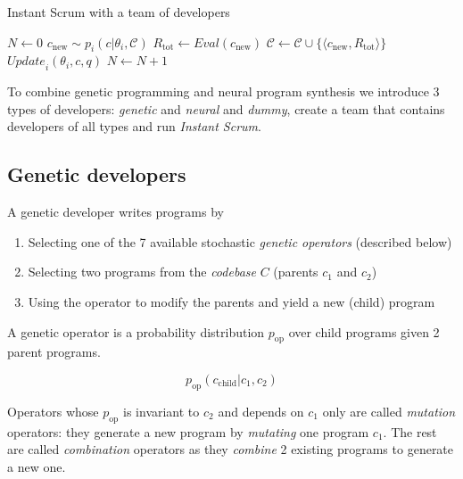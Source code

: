 \begin{algorithm}[H]
\begin{algorithmic}[1]
\caption{Instant Scrum with a team of developers}
\label{alg:instantscrum}
\State $N \gets 0$
\State $c_\text{new}\sim p_i(c | \theta_i, \mathcal{C})$ 
\State $R_\text{tot} \gets \mathit{Eval}(c_\text{new})$
\State $\mathcal{C} \gets \mathcal{C} \cup \{\langle c_\text{new}, R_\text{tot} \rangle\}$
\State $\mathit{Update}_i(\theta_i, c, q)$
\State $N \gets N+1$
\EndFor
\EndWhile
\EndProcedure
\end{algorithmic}
\end{algorithm}

To combine genetic programming and neural program synthesis we introduce 3 types of developers: \emph{genetic} and \emph{neural} and \emph{dummy}, create a team that contains developers of all types and run \emph{Instant Scrum}.

\subsection{Genetic developers}
\label{sec:genetic}

A genetic developer writes programs by
\begin{enumerate}
    \item Selecting one of the 7 available stochastic \emph{genetic operators} (described below)
    \item Selecting two programs from the \emph{codebase} $C$ (parents $c_1$ and $c_2$) 
    \item Using the operator to modify the parents and yield a new (child) program
\end{enumerate}

A genetic operator is a probability distribution $p_\text{op}$ over child programs given 2 parent programs. 

\begin{equation}
    p_\text{op}(c_\text{child}|c_1,c_2)
\end{equation}

Operators whose $p_\text{op}$ is invariant to $c_2$ and depends on $c_1$ only are called \emph{mutation} operators: they generate a new program by \emph{mutating} one program $c_1$.
The rest are called \emph{combination} operators as they \emph{combine} 2 existing programs to generate a new one.



